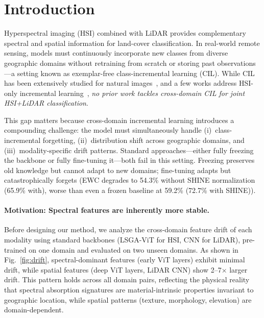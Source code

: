 \section{Introduction}
\label{sec:intro}

Hyperspectral imaging (HSI) combined with LiDAR provides complementary spectral and spatial information for land-cover classification. In real-world remote sensing, models must continuously incorporate new classes from diverse geographic domains without retraining from scratch or storing past observations---a setting known as exemplar-free class-incremental learning (CIL). While CIL has been extensively studied for natural images~\cite{rebuffi2017icarl,kirkpatrick2017ewc,li2017lwf}, and a few works address HSI-only incremental learning~\cite{deng2024dcprn,xu2025crossacl}, \emph{no prior work tackles cross-domain CIL for joint HSI+LiDAR classification}.

This gap matters because cross-domain incremental learning introduces a compounding challenge: the model must simultaneously handle (i)~class-incremental forgetting, (ii)~distribution shift across geographic domains, and (iii)~modality-specific drift patterns. Standard approaches---either fully freezing the backbone or fully fine-tuning it---both fail in this setting. Freezing preserves old knowledge but cannot adapt to new domains; fine-tuning adapts but catastrophically forgets (EWC degrades to 54.3\% without SHINE normalization (65.9\% with), worse than even a frozen baseline at 59.2\% (72.7\% with SHINE)).

\paragraph{Motivation: Spectral features are inherently more stable.}
Before designing our method, we analyze the cross-domain feature drift of each modality using standard backbones (LSGA-ViT for HSI, CNN for LiDAR), pre-trained on one domain and evaluated on two unseen domains. As shown in Fig.~\ref{fig:drift}, spectral-dominant features (early ViT layers) exhibit minimal drift, while spatial features (deep ViT layers, LiDAR CNN) show 2--7$\times$ larger drift. This pattern holds across all domain pairs, reflecting the physical reality that spectral absorption signatures are material-intrinsic properties invariant to geographic location, while spatial patterns (texture, morphology, elevation) are domain-dependent.

